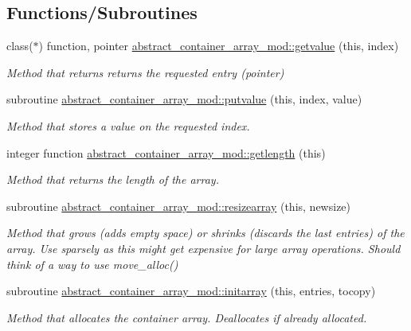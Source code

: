 \subsection*{Functions/\+Subroutines}
\begin{DoxyCompactItemize}
\item 
class($\ast$) function, pointer \hyperlink{namespaceabstract__container__array__mod_a2b3e0aec504d76c73bf7f18158924af4}{abstract\+\_\+container\+\_\+array\+\_\+mod\+::getvalue} (this, index)
\begin{DoxyCompactList}\small\item\em Method that returns returns the requested entry (pointer) \end{DoxyCompactList}\item 
subroutine \hyperlink{namespaceabstract__container__array__mod_aae1f6309c51e282a528ce78f128443e0}{abstract\+\_\+container\+\_\+array\+\_\+mod\+::putvalue} (this, index, value)
\begin{DoxyCompactList}\small\item\em Method that stores a value on the requested index. \end{DoxyCompactList}\item 
integer function \hyperlink{namespaceabstract__container__array__mod_a22d71ca3f03bf0bb5d3737338e5e349a}{abstract\+\_\+container\+\_\+array\+\_\+mod\+::getlength} (this)
\begin{DoxyCompactList}\small\item\em Method that returns the length of the array. \end{DoxyCompactList}\item 
subroutine \hyperlink{namespaceabstract__container__array__mod_ac2d73eb111ffde938f81e3f93b0cb3e0}{abstract\+\_\+container\+\_\+array\+\_\+mod\+::resizearray} (this, newsize)
\begin{DoxyCompactList}\small\item\em Method that grows (adds empty space) or shrinks (discards the last entries) of the array. Use sparsely as this might get expensive for large array operations. Should think of a way to use move\+\_\+alloc() \end{DoxyCompactList}\item 
subroutine \hyperlink{namespaceabstract__container__array__mod_a6a8e7af177f333262aba941775d6c245}{abstract\+\_\+container\+\_\+array\+\_\+mod\+::initarray} (this, entries, tocopy)
\begin{DoxyCompactList}\small\item\em Method that allocates the container array. Deallocates if already allocated. \end{DoxyCompactList}\end{DoxyCompactItemize}
